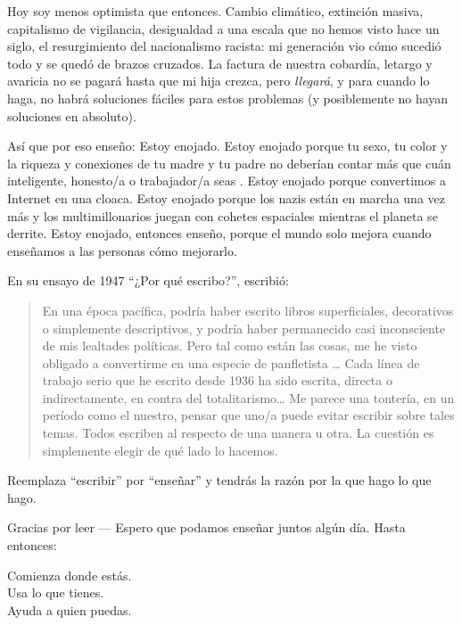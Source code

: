 Hoy soy menos optimista que entonces.
Cambio climático,
extinción masiva,
capitalismo de vigilancia,
desigualdad a una escala que no hemos visto hace un siglo,
el resurgimiento del nacionalismo racista:
mi generación vio cómo sucedió todo y se quedó de brazos cruzados.
La factura de nuestra cobardía, letargo y avaricia no se pagará hasta que mi hija crezca,
pero \emph{llegará},
y para cuando lo haga, no habrá soluciones fáciles para estos problemas
(y posiblemente no hayan soluciones en absoluto).

Así que por eso enseño:
Estoy enojado.
Estoy enojado porque tu sexo, tu color y la riqueza y conexiones de tu madre y tu padre
no deberían contar más que cuán inteligente, honesto/a o trabajador/a seas .
Estoy enojado porque convertimos a Internet en una cloaca.
Estoy enojado porque los nazis están en marcha una vez más
y los multimillonarios juegan con cohetes espaciales mientras el planeta se derrite.
Estoy enojado,
entonces enseño,
porque el mundo solo mejora cuando enseñamos a las personas cómo mejorarlo.

En su ensayo de 1947 ``¿Por qué escribo?'',
 escribió:

\begin{quote}

  En una época pacífica, podría haber escrito libros superficiales, decorativos o simplemente  descriptivos,
  y podría haber permanecido casi inconsciente de mis lealtades políticas.
  Pero tal como están las cosas, me he visto obligado a convertirme en una especie de panfletista {\ldots}
  Cada línea de trabajo serio que he escrito desde 1936 ha sido escrita,
  directa o indirectamente,
  en contra del totalitarismo{\ldots}
  Me parece una tontería,
  en un período como el nuestro,
  pensar que uno/a  puede evitar escribir sobre tales temas.
  Todos escriben al respecto  de una manera u otra.
  La cuestión es simplemente elegir de qué lado lo hacemos.

\end{quote}

\noindent
Reemplaza ``escribir'' por ``enseñar'' y tendrás la razón por la que hago lo que hago.

\vspace{\baselineskip}

\noindent
Gracias por leer --- Espero que podamos enseñar juntos algún día.
Hasta entonces:

\begin{center}

Comienza donde estás. \\
Usa lo que tienes. \\
Ayuda a quien puedas.

\end{center}

